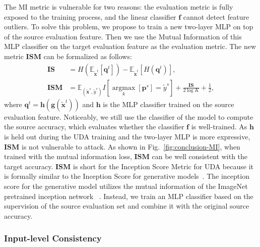 \documentclass{article} %
\begin{document}
The MI metric is vulnerable for two reasons: the evaluation metric is fully exposed to the training process, and the linear classifier $\textbf{f}$ cannot detect feature outliers. To solve this problem, we propose to train a new two-layer MLP on top of the source evaluation feature. Then we use the Mutual Information of this MLP classifier on the target evaluation feature as the evaluation metric. The new metric $\boldsymbol{ISM}$ can be formalized as follows:
\begin{align}
    \boldsymbol{IS}
	&= H(\mathbb{E}_{\tilde{\boldsymbol{x}}^t}[\boldsymbol{q}^t]) - \mathbb{E}_{\tilde{\boldsymbol{x}}^t}[H(\boldsymbol{q}^t)], \\
\boldsymbol{ISM} &= \mathbb{E}_{(\tilde{\boldsymbol{x}}^s,\tilde y^s)} I[\underset{k}{\operatorname{argmax}}
[\boldsymbol{p}^s] = \tilde y^s]+\frac{\boldsymbol{IS}}{2\log K}+\frac{1}{2},
\end{align}
where $\boldsymbol{q}^t=\textbf{h}(\textbf{g}(\tilde{\boldsymbol{x}}^t))$ and $\textbf{h}$ is the MLP classifier trained on the source evaluation feature. Noticeably, we still use the classifier of the model to compute the source accuracy, which evaluates whether the classifier $\textbf{f}$ is well-trained. As $\textbf{h}$ is held out during the UDA training and the two-layer MLP is more expressive, $\boldsymbol{ISM}$ is not vulnerable to attack. As shown in Fig.~\ref{fig:conclusion-MI}, when trained with the mutual information loss, $\boldsymbol{ISM}$ can be well consistent with the target accuracy. $\boldsymbol{ISM}$ is short for the Inception Score Metric for UDA because it is formally similar to the Inception Score for generative models~\cite{InceptionScore}. The inception score for the generative model utilizes the mutual information of the ImageNet pretrained inception network ~\cite{Inceptionv3}. Instead, we train an MLP classifier based on the supervision of the source evaluation set and combine it with the original source accuracy.

\subsubsection{Input-level Consistency}
\label{sec:3.3.3}
\end{document}
